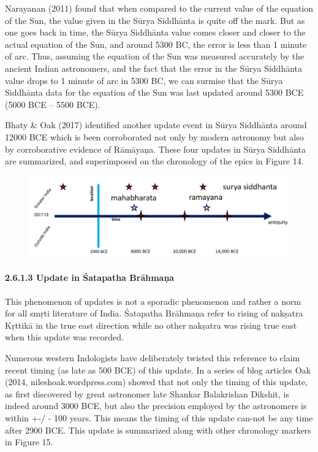 \vskip 3pt

Narayanan (2011) found that when compared to the current value of the equation of the Sun, the value given in the Sūrya Siddhānta is quite off the mark. But as one goes back in time, the Sūrya Siddhānta value comes closer and closer to the actual equation of the Sun, and around 5300 BC, the error is less than 1 minute of arc. Thus, assuming the equation of the Sun was measured accurately by the ancient Indian astronomers, and the fact that the error in the Sūrya Siddhānta value drops to 1 minute of arc in 5300 BC, we can surmise that the Sūrya Siddhānta data for the equation of the Sun was last updated around 5300 BCE (5000 BCE – 5500 BCE).

Bhaty \& Oak (2017) identified another update event in Sūrya Siddhānta around 12000 BCE which is been corroborated not only by modern astronomy but also by corroborative evidence of Rāmāyaņa. These four updates in Sūrya Siddhānta are summarized, and superimposed on the chronology of the epics in Figure 14.

\begin{figure}[!htbp]
\includegraphics[scale=0.2]{images/8-14.jpg}
\caption{}\label{art8-fig14}
\end{figure}


\paragraph*{2.6.1.3 Update in Śatapatha Brāhmaņa}

This phenomenon of updates is not a sporadic phenomenon and rather a norm for all smṛti literature of India. Śatapatha Brāhmaņa refer to rising of nakṣatra Kṛttikā in the true east direction while no other nakṣatra was rising true east when this update was recorded.

Numerous western Indologists have deliberately twisted this reference to claim recent timing (as late as 500 BCE) of this update. In a series of blog articles Oak (2014, nileshoak.wordpress.com) showed that not only the timing of this update, as first discovered by great astronomer late Shankar Balakrishan Dikshit, is indeed around 3000 BCE, but also the precision employed by the astronomers is within +-/ - 100 years. This means the timing of this update can-not be any time after 2900 BCE. This update is summarized along with other chronology markers in Figure 15.

